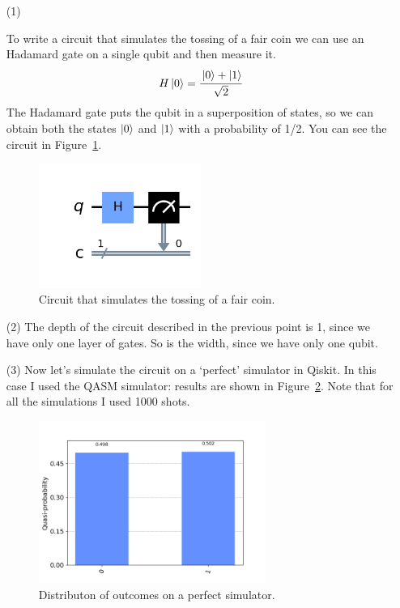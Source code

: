 \documentclass[12pt]{article}
\begin{document}
\begin{itemize}

\item[(1)]

To write a circuit that simulates the tossing of a fair coin we can use an Hadamard gate
on a single qubit and then measure it. 
\begin{gather*}
    H \ket{0} = \cfrac{\ket 0 + \ket 1}{\sqrt{2}}
\end{gather*}
The Hadamard gate puts the qubit in a
superposition of states, so we can obtain both the states $\ket 0$ and $\ket 1$ with
a probability of 1/2. You can see the circuit in Figure~\ref{fig:coin_circuit}.
\begin{figure}[h]
    \centering
    \includegraphics[width=0.5\textwidth]{images/circuit_5.png}
    \caption{Circuit that simulates the tossing of a fair coin.}
    \label{fig:coin_circuit}
\end{figure}

\item[(2)]
The depth of the circuit described in the previous point is 1, since we have only one
layer of gates. So is the width, since we have only one qubit.

\item[(3)]
Now let's simulate the circuit on a `perfect' simulator in Qiskit. In this case 
I used the QASM simulator: results are shown in Figure~\ref{fig:p_distribution}.
Note that for all the simulations I used 1000 shots.
\begin{figure}[h]
    \centering
    \includegraphics[width=0.7\textwidth]{images/c5_perfect_distribution.png}
    \caption{Distributon of outcomes on a perfect simulator.}
    \label{fig:p_distribution}
\end{figure}


\end{itemize}
\end{document}
